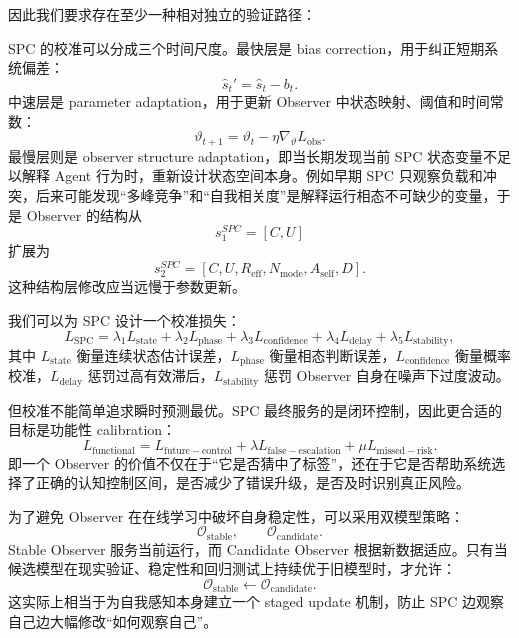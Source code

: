 因此我们要求存在至少一种相对独立的验证路径：
\begin{statementbox}
\centering
{}
\end{statementbox}

SPC 的校准可以分成三个时间尺度。最快层是 bias correction，用于纠正短期系统偏差：
\begin{equation}
\hat s_t'
=
\hat s_t-b_t.
\end{equation}
中速层是 parameter adaptation，用于更新 Observer 中状态映射、阈值和时间常数：
\begin{equation}
\vartheta_{t+1}
=
\vartheta_t
-
\eta
\nabla_\vartheta
L_{\mathrm{obs}}.
\end{equation}
最慢层则是 observer structure adaptation，即当长期发现当前 SPC 状态变量不足以解释 Agent 行为时，重新设计状态空间本身。例如早期 SPC 只观察负载和冲突，后来可能发现“多峰竞争”和“自我相关度”是解释运行相态不可缺少的变量，于是 Observer 的结构从
\begin{equation}
s^{SPC}_1
=
[C,U]
\end{equation}
扩展为
\begin{equation}
s^{SPC}_2
=
[C,U,R_{\mathrm{eff}},N_{\mathrm{mode}},A_{\mathrm{self}},D].
\end{equation}
这种结构层修改应当远慢于参数更新。

我们可以为 SPC 设计一个校准损失：
\begin{equation}
L_{\mathrm{SPC}}
=
\lambda_1 L_{\mathrm{state}}
+
\lambda_2 L_{\mathrm{phase}}
+
\lambda_3 L_{\mathrm{confidence}}
+
\lambda_4 L_{\mathrm{delay}}
+
\lambda_5 L_{\mathrm{stability}},
\end{equation}
其中 $L_{\mathrm{state}}$ 衡量连续状态估计误差，$L_{\mathrm{phase}}$ 衡量相态判断误差，$L_{\mathrm{confidence}}$ 衡量概率校准，$L_{\mathrm{delay}}$ 惩罚过高有效滞后，$L_{\mathrm{stability}}$ 惩罚 Observer 自身在噪声下过度波动。

但校准不能简单追求瞬时预测最优。SPC 最终服务的是闭环控制，因此更合适的目标是功能性 calibration：
\begin{equation}
L_{\mathrm{functional}}
=
L_{\mathrm{future-control}}
+
\lambda
L_{\mathrm{false-escalation}}
+
\mu
L_{\mathrm{missed-risk}}.
\end{equation}
即一个 Observer 的价值不仅在于“它是否猜中了标签”，还在于它是否帮助系统选择了正确的认知控制区间，是否减少了错误升级，是否及时识别真正风险。

为了避免 Observer 在在线学习中破坏自身稳定性，可以采用双模型策略：
\begin{equation}
\mathcal O_{\mathrm{stable}},
\qquad
\mathcal O_{\mathrm{candidate}}.
\end{equation}
Stable Observer 服务当前运行，而 Candidate Observer 根据新数据适应。只有当候选模型在现实验证、稳定性和回归测试上持续优于旧模型时，才允许：
\begin{equation}
\mathcal O_{\mathrm{stable}}
\leftarrow
\mathcal O_{\mathrm{candidate}}.
\end{equation}
这实际上相当于为自我感知本身建立一个 staged update 机制，防止 SPC 边观察自己边大幅修改“如何观察自己”。

